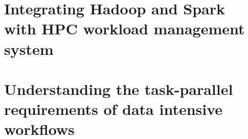 \section{Integrating Hadoop and Spark with HPC workload management system}



\section{Understanding the task-parallel requirements of data intensive workflows}
